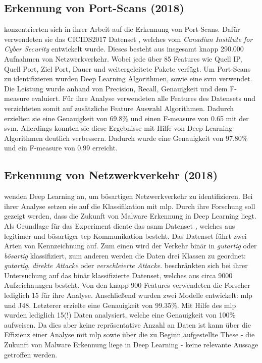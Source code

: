 \documentclass[
    12pt, %
    DIV10,
    ngerman, %
    a4paper, %
    oneside, %
    titlepage, %
    parskip=half, %
    headings=normal, %
    listof=totoc, %
    bibliography=totoc, %
    index=totoc, %
    captions=tableheading, %
    final %
]{scrreprt}
\begin{document}
\subsection{Erkennung von Port-Scans (2018)}
\textcite{Aksu2019} konzentrierten sich in ihrer Arbeit auf die Erkennung von Port-Scans. Dafür verwendeten sie das CICIDS2017 Datenset \parencite{Sharafaldin2018}, welches vom \emph{Canadian Institute for Cyber Security} entwickelt wurde. Dieses besteht aus insgesamt knapp 290.000 Aufnahmen von Netzwerkverkehr. Wobei jede über 85 Features wie Quell IP, Quell Port, Ziel Port, Dauer und weitergeleitete Pakete verfügt. Um Port-Scans zu identifizieren wurden Deep Learning Algorithmen, sowie eine \ac{svm} verwendet. Die Leistung wurde anhand von Precision, Recall, Genauigkeit und dem F-measure evaluiert. Für ihre Analyse verwendeten  \textcite{Aksu2019} alle Features des Datensets und verzichteten somit auf zusätzliche Feature Auswahl Algorithmen. Dadurch erzielten sie eine Genauigkeit von 69.8\% und einen F-measure von 0.65 mit der \ac{svm}. Allerdings konnten sie diese Ergebnisse mit Hilfe von Deep Learning Algorithmen deutlich verbessern. Dadurch wurde eine Genauigkeit von 97.80\% und ein F-measure von 0.99 erreicht.
%
\subsection{Erkennung von Netzwerkverkehr (2018)}\label{asnm}
\textcite{Teoh2018} wenden Deep Learning an, um bösartigen Netzwerkverkehr zu identifizieren. Bei ihrer Analyse setzen sie auf die Klassifikation mit \ac{mlp}. Durch ihre Forschung soll gezeigt werden, dass die Zukunft von Malware Erkennung in Deep Learning liegt. Als Grundlage für das Experiment diente das \ac{asnm} Datenset \parencite{phdthesis}, welches aus legitimer und bösartiger \ac{tcp} Kommunikation besteht. Das Datenset führt zwei Arten von Kennzeichnung auf. Zum einen wird der Verkehr binär in \emph{gutartig} oder \emph{bösartig} klassifiziert, zum anderen werden die Daten drei Klassen zu geordnet: \emph{gutartig}, \emph{direkte Attacke} oder \emph{verschleierte Attacke}. \textcite{Teoh2018} beschränkten sich bei ihrer Untersuchung auf das binär klassifizierte Datenset, welches aus circa 9000 Aufzeichnungen besteht. Von den knapp 900 Features verwendeten die Forscher lediglich 15 für ihre Analyse. Anschlie{\ss}end wurden zwei Modelle entwickelt: \ac{mlp} und J48. Letzterer erzielte eine Genauigkeit von 99.35\%. Mit Hilfe des \ac{mlp} wurden lediglich 15(!) Daten analysiert, welche eine Genauigkeit von 100\% aufweisen. Da dies aber keine repräsentative Anzahl an Daten ist kann über die Effizienz einer Analyse mit \ac{mlp} sowie über die zu Beginn aufgestellte These - die Zukunft von Malware Erkennung liege in Deep Learning - keine relevante Aussage getroffen werden. 
%
\end{document}
